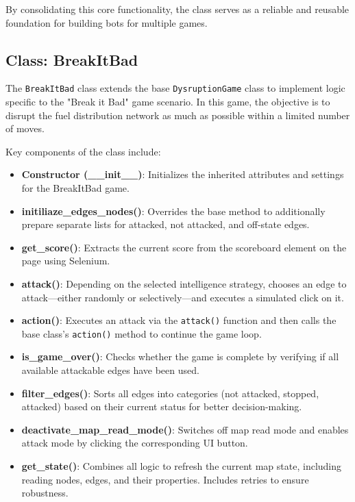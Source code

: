 \documentclass[12pt,a4paper]{article}
\begin{document}
    By consolidating this core functionality, the class serves as a reliable and reusable foundation for building bots for multiple games.


    \subsection*{Class: BreakItBad}
    \label{subsec:class-breakitbad}

        The \texttt{BreakItBad} class extends the base \texttt{DysruptionGame} class to implement logic specific to the "Break it Bad" game scenario. In this game, the objective is to disrupt the fuel distribution network as much as possible within a limited number of moves.

        Key components of the class include:

        \begin{itemize}
            \item \textbf{Constructor (\_\_init\_\_)}: Initializes the inherited attributes and settings for the BreakItBad game.

            \item \textbf{initiliaze\_edges\_nodes()}: Overrides the base method to additionally prepare separate lists for attacked, not attacked, and off-state edges.

            \item \textbf{get\_score()}: Extracts the current score from the scoreboard element on the page using Selenium.

            \item \textbf{attack()}: Depending on the selected intelligence strategy, chooses an edge to attack—either randomly or selectively—and executes a simulated click on it.

            \item \textbf{action()}: Executes an attack via the \texttt{attack()} function and then calls the base class's \texttt{action()} method to continue the game loop.

            \item \textbf{is\_game\_over()}: Checks whether the game is complete by verifying if all available attackable edges have been used.

            \item \textbf{filter\_edges()}: Sorts all edges into categories (not attacked, stopped, attacked) based on their current status for better decision-making.

            \item \textbf{deactivate\_map\_read\_mode()}: Switches off map read mode and enables attack mode by clicking the corresponding UI button.

            \item \textbf{get\_state()}: Combines all logic to refresh the current map state, including reading nodes, edges, and their properties. Includes retries to ensure robustness.
        \end{itemize}
\end{document}
